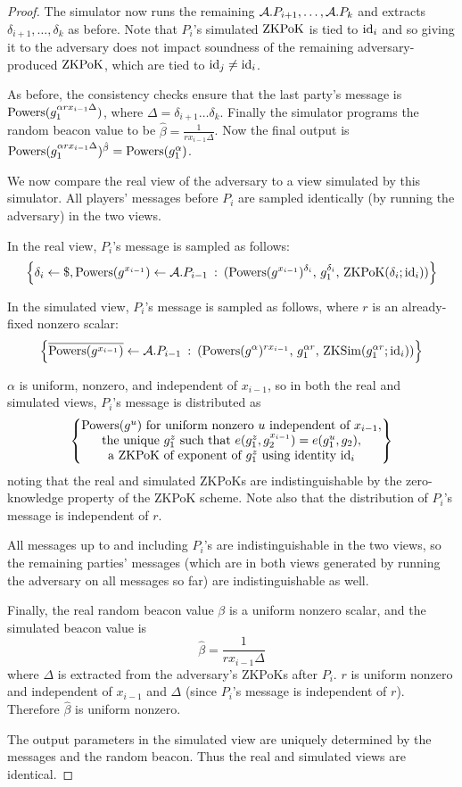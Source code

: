 \documentclass{article}
\newcommand{\?}{\stackrel{?}{=}}
\begin{document}
\begin{proof}
The simulator now runs the remaining $\mathcal{A}.P_{i+1}, \dots, \mathcal{A}.P_{k}$ and extracts $\delta_{i+1}, \dots, \delta_{k}$ as before. Note that $P_i$'s simulated $\operatorname{ZKPoK}$ is tied to $\mathrm{id}_i$ and so giving it to the adversary does not impact soundness of the remaining adversary-produced $\operatorname{ZKPoK}$, which are tied to $\mathrm{id}_j \ne \mathrm{id}_i$.

As before, the consistency checks ensure that the last party's message is $\mathrm{Powers}(g_1^{\alpha r x_{i-1} \Delta})$, where $\Delta = \delta_{i+1} \dots \delta_{k}$. Finally the simulator programs the random beacon value to be $\hat{\beta} = \frac{1}{r x_{i-1} \Delta}$. Now the final output is $\mathrm{Powers}(g_1^{\alpha r x_{i-1} \Delta})^{\hat{\beta}} = \mathrm{Powers}(g_1^\alpha)$.

We now compare the real view of the adversary to a view simulated by this simulator. All players' messages before $P_i$ are sampled identically (by running the adversary) in the two views.

In the real view, $P_i$'s message is sampled as follows:
\[
\left\{ \delta_i \gets \$ , \mathrm{Powers}(g^{x_{i-1}}) \gets \mathcal{A}.P_{i-1} \::\: (\mathrm{Powers}(g^{x_{i-1}})^{\delta_i},\, g_1^{\delta_i},\, \operatorname{ZKPoK}(\delta_i; \mathrm{id}_i)) \right\}
\]

In the simulated view, $P_i$'s message is sampled as follows, where $r$ is an already-fixed nonzero scalar:
\[
\left\{ \overline{\mathrm{Powers}(g^{x_{i-1}})} \gets \mathcal{A}.P_{i-1} \::\: (\mathrm{Powers}(g^{\alpha})^{r x_{i-1}},\, g_1^{\alpha r},\, \mathrm{ZKSim}(g_1^{\alpha r}; \mathrm{id}_i)) \right\}
\]

$\alpha$ is uniform, nonzero, and independent of $x_{i-1}$, so in both the real and simulated views, $P_i$'s message is distributed as
\[
\begin{Bmatrix}
\mathrm{Powers}(g^u) \text{ for uniform nonzero $u$ independent of $x_{i-1}$}, \\
\text{the unique $g_1^z$ such that $e(g_1^z, g_2^{x_{i-1}}) = e(g_1^{u}, g_2)$}, \\
\text{a ZKPoK of exponent of $g_1^z$ using identity $\mathrm{id}_i$}
\end{Bmatrix}
\]
noting that the real and simulated ZKPoKs are indistinguishable by the zero-knowledge property of the ZKPoK scheme. Note also that the distribution of $P_i$'s message is independent of $r$.

All messages up to and including $P_i$'s are indistinguishable in the two views, so the remaining parties' messages (which are in both views generated by running the adversary on all messages so far) are indistinguishable as well.

Finally, the real random beacon value $\beta$ is a uniform nonzero scalar, and the simulated beacon value is
\[
\hat{\beta} = \frac1{rx_{i-1} \Delta}
\]
where $\Delta$ is extracted from the adversary's ZKPoKs after $P_i$. $r$ is uniform nonzero and independent of $x_{i-1}$ and $\Delta$ (since $P_i$'s message is independent of $r$). Therefore $\hat{\beta}$ is uniform nonzero.

The output parameters in the simulated view are uniquely determined by the messages and the random beacon. Thus the real and simulated views are identical.
\end{proof}
\end{document}
